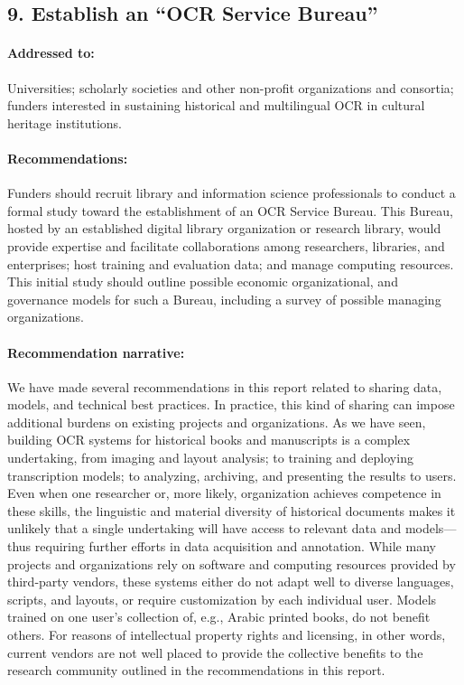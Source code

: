 \documentclass[twoside,11pt]{report}
\begin{document}
\subsection{9. Establish an ``OCR Service Bureau''}
\label{sec:rec-bureau}

\paragraph{Addressed to:} Universities; scholarly societies and other non-profit organizations and consortia; funders interested in sustaining historical and multilingual OCR in cultural heritage institutions.

\paragraph{Recommendations:} Funders should recruit library and information science professionals to conduct a formal study toward the establishment of an OCR Service Bureau. This Bureau, hosted by an established digital library organization or research library, would provide expertise and facilitate collaborations among researchers, libraries, and enterprises; host training and evaluation data; and manage computing resources. This initial study should outline possible economic organizational, and governance models for such a Bureau, including a survey of possible managing organizations.

\paragraph{Recommendation narrative:}

We have made several recommendations in this report related to sharing data, models, and technical best practices. In practice, this kind of sharing can impose additional burdens on existing projects and organizations. As we have seen, building OCR systems for historical books and manuscripts is a complex undertaking, from imaging and layout analysis; to training and deploying transcription models; to analyzing, archiving, and presenting the results to users. Even when one researcher or, more likely, organization achieves competence in these skills, the linguistic and material diversity of historical documents makes it unlikely that a single undertaking will have access to relevant data and models---thus requiring further efforts in data acquisition and annotation. While many projects and organizations rely on software and computing resources provided by third-party vendors, these systems either do not adapt well to diverse languages, scripts, and layouts, or require customization by each individual user. Models trained on one user's collection of, e.g., Arabic printed books, do not benefit others. For reasons of intellectual property rights and licensing, in other words, current vendors are not well placed to provide the collective benefits to the research community outlined in the recommendations in this report.
\end{document}
